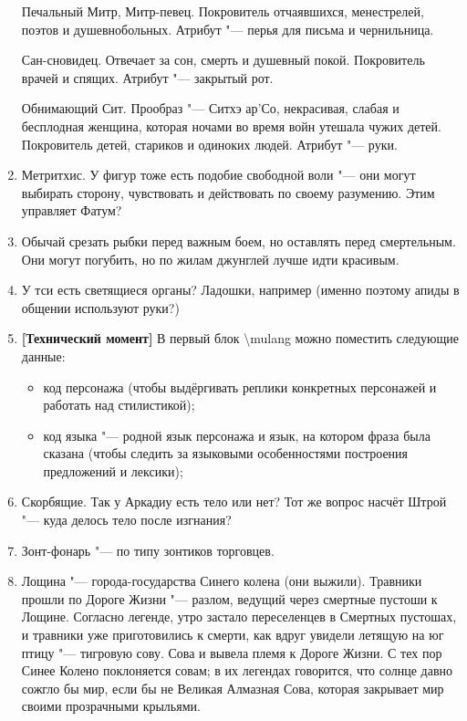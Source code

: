 \begin{enumerate}
Печальный Митр, Митр-певец.
Покровитель отчаявшихся, менестрелей, поэтов и душевнобольных.
Атрибут "--- перья для письма и чернильница.

Сан-сновидец.
Отвечает за сон, смерть и душевный покой.
Покровитель врачей и спящих.
Атрибут "--- закрытый рот.

Обнимающий Сит.
Прообраз "--- Ситхэ ар'Со, некрасивая, слабая и бесплодная женщина, которая ночами во время войн утешала чужих детей.
Покровитель детей, стариков и одиноких людей.
Атрибут "--- руки.

\item Метритхис.
У фигур тоже есть подобие свободной воли "--- они могут выбирать сторону, чувствовать и действовать по своему разумению.
Этим управляет Фатум?

\item Обычай срезать рыбки перед важным боем, но оставлять перед смертельным.
Они могут погубить, но по жилам джунглей лучше идти красивым.

\item У тси есть светящиеся органы?
Ладошки, например (именно поэтому апиды в общении используют руки?)

\item \textbf{[Технический момент]} В первый блок \textbackslash mulang можно поместить следующие данные:

\begin{itemize}
\item код персонажа (чтобы выдёргивать реплики конкретных персонажей и работать над стилистикой);
\item код языка "--- родной язык персонажа и язык, на котором фраза была сказана (чтобы следить за языковыми особенностями построения предложений и лексики);
\end{itemize}

\item Скорбящие.
Так у Аркадиу есть тело или нет?
Тот же вопрос насчёт Штрой "--- куда делось тело после изгнания?

\item Зонт-фонарь "--- по типу зонтиков торговцев.

\item Лощина "--- города-государства Синего колена (они выжили).
Травники прошли по Дороге Жизни "--- разлом, ведущий через смертные пустоши к Лощине.
Согласно легенде, утро застало переселенцев в Смертных пустошах, и травники уже приготовились к смерти, как вдруг увидели летящую на юг птицу "--- тигровую сову.
Сова и вывела племя к Дороге Жизни.
С тех пор Синее Колено поклоняется совам;
в их легендах говорится, что солнце давно сожгло бы мир, если бы не Великая Алмазная Сова, которая закрывает мир своими прозрачными крыльями.


\end{enumerate}
